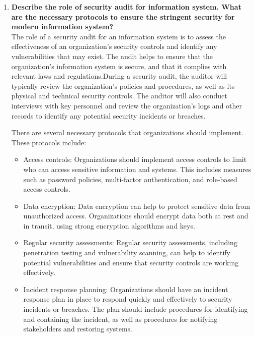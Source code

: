 \documentclass[12pt]{article}
\begin{document}
\begin{enumerate}
    \item{\bfseries Describe the role of security audit for information system. What are the necessary protocols to ensure the stringent security for modern information system?\\}
    The role of a security audit for an information system is to assess the effectiveness of an organization's security controls and identify any vulnerabilities that may exist. The audit helps to ensure that the organization's information system is secure, and that it complies with relevant laws and regulations.During a security audit, the auditor will typically review the organization's policies and procedures, as well as its physical and technical security controls. The auditor will also conduct interviews with key personnel and review the organization's logs and other records to identify any potential security incidents or breaches.

    There are several necessary protocols that organizations should implement. These protocols include:
    \begin{itemize}
        \item Access controls: Organizations should implement access controls to limit who can access sensitive information and systems. This includes measures such as password policies, multi-factor authentication, and role-based access controls.
        
        \item Data encryption: Data encryption can help to protect sensitive data from unauthorized access. Organizations should encrypt data both at rest and in transit, using strong encryption algorithms and keys.
        
        \item Regular security assessments: Regular security assessments, including penetration testing and vulnerability scanning, can help to identify potential vulnerabilities and ensure that security controls are working effectively.
        
        \item Incident response planning: Organizations should have an incident response plan in place to respond quickly and effectively to security incidents or breaches. The plan should include procedures for identifying and containing the incident, as well as procedures for notifying stakeholders and restoring systems.
        

\end{itemize}
\end{enumerate}
\end{document}

